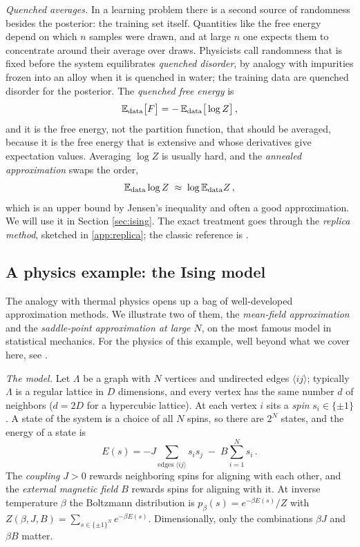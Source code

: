 \documentclass[11pt]{article}
\newcommand{\E}{\mathbb{E}}
\begin{document}
\emph{Quenched averages.} In a learning problem there is a second source of randomness besides the posterior: the training set itself. Quantities like the free energy depend on which $n$ samples were drawn, and at large $n$ one expects them to concentrate around their average over draws. Physicists call randomness that is fixed before the system equilibrates \emph{quenched disorder}, by analogy with impurities frozen into an alloy when it is quenched in water; the training data are quenched disorder for the posterior. The \emph{quenched free energy} is
%
\begin{equation}
    \E_{\rm data}\big[F\big] = -\,\E_{\rm data}\big[\log Z\big]\,, \label{quenched-F}
\end{equation}
%
and it is the free energy, not the partition function, that should be averaged, because it is the free energy that is extensive and whose derivatives give expectation values. Averaging $\log Z$ is usually hard, and the \emph{annealed approximation} swaps the order,
%
\begin{equation}
    \E_{\rm data}\log Z \;\approx\; \log\E_{\rm data}Z\,, \label{annealed-swap}
\end{equation}
%
which is an upper bound by Jensen's inequality and often a good approximation. We will use it in Section \ref{sec:ising}. The exact treatment goes through the \emph{replica method}, sketched in \cref{app:replica}; the classic reference is \cite{engel2001statistical}.

\subsection{A physics example: the Ising model}
\label{sec:ising-model}

The analogy with thermal physics opens up a bag of well-developed approximation methods. We illustrate two of them, the \emph{mean-field approximation} and the \emph{saddle-point approximation at large $N$}, on the most famous model in statistical mechanics. For the physics of this example, well beyond what we cover here, see \cite[Chapter 1]{TongSFT}.

\emph{The model.} Let $\Lambda$ be a graph with $N$ vertices and undirected edges $\langle ij\rangle$; typically $\Lambda$ is a regular lattice in $D$ dimensions, and every vertex has the same number $d$ of neighbors ($d=2D$ for a hypercubic lattice). At each vertex $i$ sits a \emph{spin} $s_i\in\{\pm 1\}$. A state of the system is a choice of all $N$ spins, so there are $2^N$ states, and the energy of a state is
%
\begin{equation}
    E(s) = -J\!\!\sum_{\text{edges }\langle ij\rangle}\!\! s_i s_j \;-\; B\sum_{i=1}^N s_i\,. \label{ising-E}
\end{equation}
%
The \emph{coupling} $J>0$ rewards neighboring spins for aligning with each other, and the \emph{external magnetic field} $B$ rewards spins for aligning with it. At inverse temperature $\beta$ the Boltzmann distribution is $p_\beta(s) = e^{-\beta E(s)}/Z$ with $Z(\beta,J,B) = \sum_{s\in\{\pm1\}^N} e^{-\beta E(s)}$. Dimensionally, only the combinations $\beta J$ and $\beta B$ matter.
\end{document}
